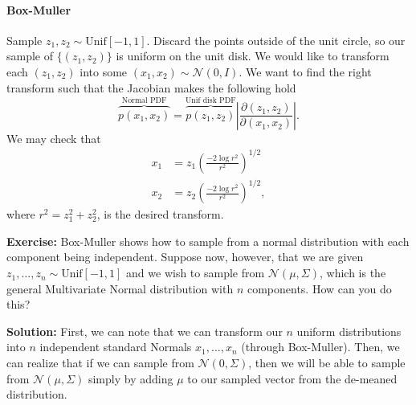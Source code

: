 \documentclass{article}
\begin{document}
\paragraph{Box-Muller} Sample $z_1,z_2 \sim \text{Unif}[-1,1]$. Discard the points outside of the unit circle, so our sample of $\{(z_1,z_2)\}$ is uniform on the unit disk. We would like to transform each $(z_1,z_2)$ into some $(x_1,x_2) \sim \mathcal N(0,I)$. We want to find the right transform such that the Jacobian makes the following hold \[
\overbrace{p(x_1,x_2)}^{\text{Normal PDF}} = \overbrace{p(z_1,z_2)}^{\text{Unif disk PDF}} \left|\frac{\partial(z_1,z_2)}{\partial(x_1,x_2)}\right|.
\]
We may check that \begin{align*}
x_1 &= z_1 \left({\frac{-2\log r^2}{r^2}}\right)^{1/2}\\
x_2 &= z_2 \left({\frac{-2\log r^2}{r^2}}\right)^{1/2},
\end{align*}
where $r^2 = z_1^2 + z_2^2$, is the desired transform.







\medskip

{\bf Exercise:} Box-Muller shows how to sample from a normal distribution with
each component being independent. Suppose now, however, that we are given $z_1,
\ldots, z_n \sim \text{Unif}[-1,1]$ and we wish to sample from $\mathcal{N}(\mu,
\Sigma)$, which is the general Multivariate Normal distribution with $n$
components. How can you do this?

\medskip

{\bf Solution:} First, we can note that we can transform our $n$ uniform
distributions into $n$ independent standard Normals $x_1, \ldots, x_n$ (through
Box-Muller). Then, we can realize that if we can sample from
$\mathcal{N}(0,\Sigma)$, then we will be able to sample from $\mathcal{N}(\mu,
\Sigma)$ simply by adding $\mu$ to our sampled vector from the de-meaned
distribution.
\end{document}
